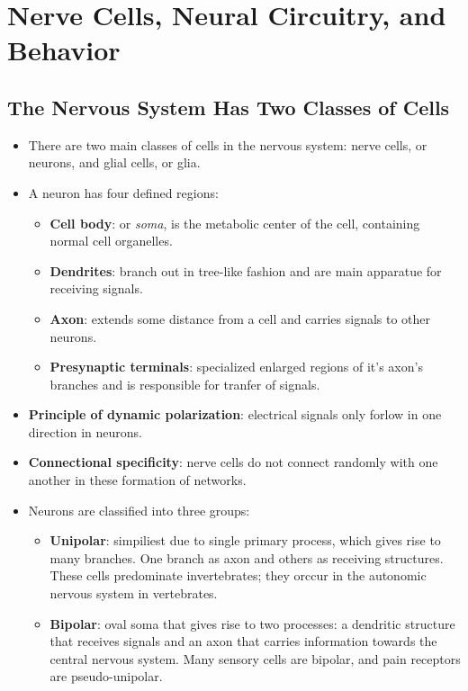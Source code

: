 \documentclass[12pt,a4paper]{article}
\begin{document}
\clearpage
\section{Nerve Cells, Neural Circuitry, and Behavior}
\subsection{The Nervous System Has Two Classes of Cells}
\begin{itemize}
    \item There are two main classes of cells in the nervous system: nerve cells, or neurons, and glial cells, or glia.
    \item A neuron has four defined regions:
        \begin{itemize}
            \item \textbf{Cell body}: or \textit{soma}, is the metabolic center of the cell, containing normal cell organelles.
            \item \textbf{Dendrites}: branch out in tree-like fashion and are main apparatue for receiving signals.
            \item \textbf{Axon}: extends some distance from a cell and carries signals to other neurons.
            \item \textbf{Presynaptic terminals}: specialized enlarged regions of it's axon's branches and is responsible for tranfer of signals.
        \end{itemize}
    \item \textbf{Principle of dynamic polarization}: electrical signals only forlow in one direction in neurons.
    \item \textbf{Connectional specificity}: nerve cells do not connect randomly with one another in these formation of networks.
    \item Neurons are classified into three groups:
        \begin{itemize}
            \item \textbf{Unipolar}: simpiliest due to single primary process, which gives rise to many branches. One branch as axon and others as receiving structures. These cells predominate invertebrates; they orccur in the autonomic nervous system in vertebrates. 
            \item \textbf{Bipolar}: oval soma that gives rise to two processes: a dendritic structure that receives signals and an axon that carries information towards the central nervous system. Many sensory cells are bipolar, and pain receptors are pseudo-unipolar. 

\end{itemize}
\end{itemize}
\end{document}
